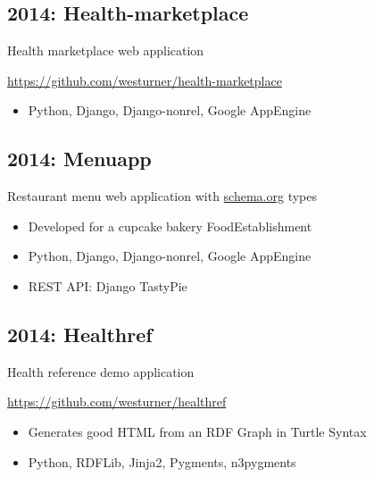 \documentclass[letter,,openany,oneside]{sphinxhowto}
\begin{document}
\subsection{2014: Health-marketplace}
\label{resume:health-marketplace}
\begin{DUlineblock}{0em}
\item[] Health marketplace web application
\item[] \href{https://github.com/westurner/health-marketplace}{https://github.com/westurner/health-marketplace}
\end{DUlineblock}
\begin{itemize}
\item {} 
Python, Django, Django-nonrel, Google AppEngine

\end{itemize}


\subsection{2014: Menuapp}
\label{resume:menuapp}
\begin{DUlineblock}{0em}
\item[] Restaurant menu web application with \href{http://schema.org/docs/full.html}{schema.org} types
\end{DUlineblock}
\begin{itemize}
\item {} 
Developed for a cupcake bakery FoodEstablishment

\item {} 
Python, Django, Django-nonrel, Google AppEngine

\item {} 
REST API: Django TastyPie

\end{itemize}


\subsection{2014: Healthref}
\label{resume:healthref}
\begin{DUlineblock}{0em}
\item[] Health reference demo application
\item[] \href{https://github.com/westurner/healthref}{https://github.com/westurner/healthref}
\end{DUlineblock}
\begin{itemize}
\item {} 
Generates good HTML from an RDF Graph in Turtle Syntax

\item {} 
Python, RDFLib, Jinja2, Pygments, n3pygments

\end{itemize}
\end{document}
